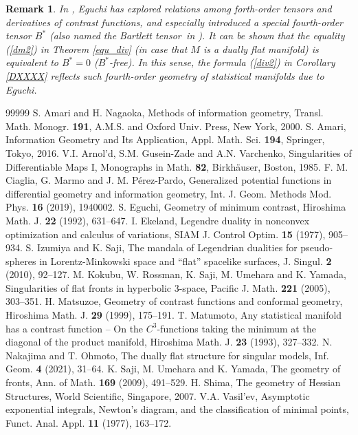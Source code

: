 \documentclass[10pt]{amsart}
\newtheorem{rem}[thm]{\bf Remark}
\begin{document}
\begin{rem}\upshape 
In \cite{Eguchi}, Eguchi has explored relations among forth-order tensors and derivatives of contrast functions, and especially introduced 
a special fourth-order tensor $B^*$ (also named the {\em Bartlett tensor}\, in \cite{Matsuzoe1999}). 
It can be shown that the equality (\ref{dm2}) in Theorem \ref{equ_div} (in case that $M$ is a dually flat manifold) is equivalent to $B^*=0$ ($B^*$-free). In this sense,  the formula (\ref{div2}) in Corollary \ref{DXXXX} reflects such fourth-order geometry of statistical manifolds due to Eguchi. 
\end{rem}



\begin{thebibliography}{99999}
S. Amari and H. Nagaoka, 
Methods of information geometry, Transl. Math. Monogr. \textbf{191}, A.M.S. and Oxford Univ. Press, New York, 2000. 
S. Amari,  
Information Geometry and Its Application, 
Appl. Math. Sci. \textbf{194}, Springer, Tokyo, 2016. 
V.I. Arnol'd, S.M. Gusein-Zade and A.N. Varchenko, 
Singularities of Differentiable Maps I, Monographs in Math. \textbf{82}, Birkh\"auser, Boston, 1985. 
F. M. Ciaglia, G. Marmo and J. M. P\'{e}rez-Pardo, 
Generalized potential functions in differential geometry and information geometry, 
Int. J. Geom. Methods Mod. Phys. \textbf{16} (2019), 1940002.
S. Eguchi, 
Geometry of minimum contrast, 
Hiroshima Math. J. \textbf{22} (1992), 631--647.
I. Ekeland, 
Legendre duality in nonconvex optimization and calculus of variations, 
SIAM J. Control Optim. \textbf{15} (1977), 905--934. 
S. Izumiya and K. Saji, 
The mandala of Legendrian dualities for pseudo-spheres in Lorentz-Minkowski space and ``flat'' spacelike surfaces, 
J. Singul. \textbf{2} (2010), 92--127.
M. Kokubu, W. Rossman, K. Saji, M. Umehara and K. Yamada, 
Singularities of flat fronts in hyperbolic 3-space, 
Pacific J. Math. \textbf{221} (2005), 303--351. 
%
H. Matsuzoe, 
Geometry of contrast functions and conformal geometry, 
Hiroshima Math. J. \textbf{29} (1999), 175--191.
%
T. Matumoto, 
Any statistical manifold has a contrast function -- On the $C^3$-functions taking the minimum at the diagonal of the product manifold, 
Hiroshima Math. J. \textbf{23} (1993), 327--332. 
%
N. Nakajima and T. Ohmoto, 
The dually flat structure for singular models, 
Inf. Geom. \textbf{4} (2021), 31--64.
%
K. Saji, M. Umehara and K. Yamada, 
The geometry of fronts, 
Ann. of Math. \textbf{169} (2009), 491--529. 
H. Shima, 
The geometry of Hessian Structures, 
World Scientific, Singapore, 2007.
V.A. Vasil'ev, 
Asymptotic exponential integrals, Newton's diagram, and the classification of minimal points, 
Funct. Anal. Appl. \textbf{11} (1977), 163--172.
\end{thebibliography}
\end{document}
